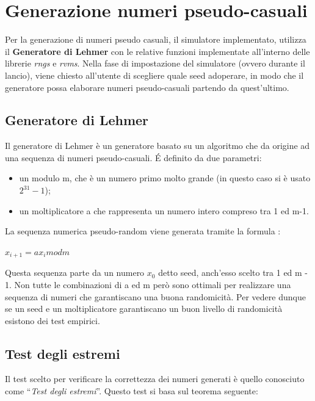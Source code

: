 \def \ti{\textit}
\def \bf{\textbf}

\chapter{Generazione numeri pseudo-casuali}
	\label{cap:generatorerandom}

Per la generazione di numeri pseudo casuali, il simulatore implementato, utilizza il \textbf{Generatore di Lehmer} con le relative funzioni implementate all'interno delle librerie \textit{rngs} e \textit{rvms}. Nella fase di impostazione del simulatore (ovvero durante il lancio), viene chiesto all'utente di scegliere quale seed adoperare, in modo che il generatore possa elaborare numeri pseudo-casuali partendo da quest'ultimo.

\section{Generatore di Lehmer}
Il generatore di Lehmer è un generatore basato su un algoritmo che da origine ad una sequenza di numeri pseudo-casuali. \'E definito da due parametri:

\begin{itemize}
 \item un modulo m, che è un numero primo molto grande (in questo caso si è usato $2^{31} - 1$);
 \item un moltiplicatore a che rappresenta un numero intero compreso tra 1 ed m-1.
\end{itemize}

La sequenza numerica pseudo-random viene generata tramite la formula :

\begin{center} $x_{i+1} = ax_{i} mod m$ \end{center}

\noindent Questa sequenza parte da un numero $x_{0}$ detto seed, anch'esso scelto tra 1 ed m - 1. Non tutte le combinazioni di a ed m però sono ottimali per realizzare una sequenza di numeri che garantiscano una buona randomicità. Per vedere dunque se un seed e un moltiplicatore garantiscano un buon livello di randomicità esistono dei test empirici.

\section{Test degli estremi}
Il test scelto per verificare la correttezza dei numeri generati è quello conosciuto come ``\textit{Test degli estremi}''. Questo test si basa sul teorema seguente:

